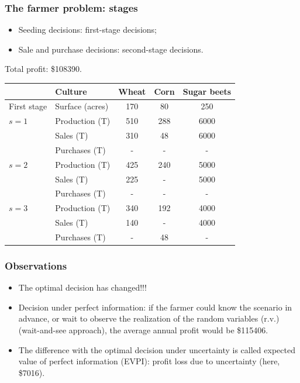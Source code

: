 \documentclass[aspectratio=169]{beamer}
\def\blue{\color{blue}}
\def\red{\color{red}}
\begin{document}
\begin{frame}
\frametitle{The farmer problem: stages}

\begin{itemize}
	\item 
Seeding decisions: {\red first-stage decisions};
	\item 
Sale and purchase decisions: {\red second-stage decisions}.
\end{itemize}

Total profit: \$108390.
\begin{center}
\begin{tabular}{llccc}
\hline
& Culture & Wheat & Corn & Sugar beets \\
\hline
First stage & Surface (acres) & 170 & 80 & 250 \\
\hline
$s = 1$ & Production (T) & 510 & 288 & 6000 \\
& Sales (T) & 310 & 48 & 6000 \\
& Purchases (T) & - & - & - \\
\hline
$s = 2$ & Production (T) & 425 & 240 & 5000 \\
& Sales (T) & 225 & - & 5000 \\
& Purchases (T) & - & - & - \\
\hline
$s = 3$ & Production (T) & 340 & 192 & 4000 \\
& Sales (T) & 140 & - & 4000 \\
& Purchases (T) & - & 48 & - \\
\hline
\end{tabular}
\end{center}

\end{frame}

\begin{frame}
\frametitle{Observations}

\begin{itemize}
	\item 
The optimal decision has changed!!!
\item
Decision under {\red perfect information}:
if the farmer could know the scenario in advance, or wait to observe the realization of the random variables (r.v.) ({\red wait-and-see} approach),
the average annual profit would be \$115406.
\item
The difference with the optimal decision under uncertainty is called {\blue expected value of perfect information (EVPI)}: profit loss due to uncertainty (here, \$7016). 
\end{itemize}

\end{frame}
\end{document}
